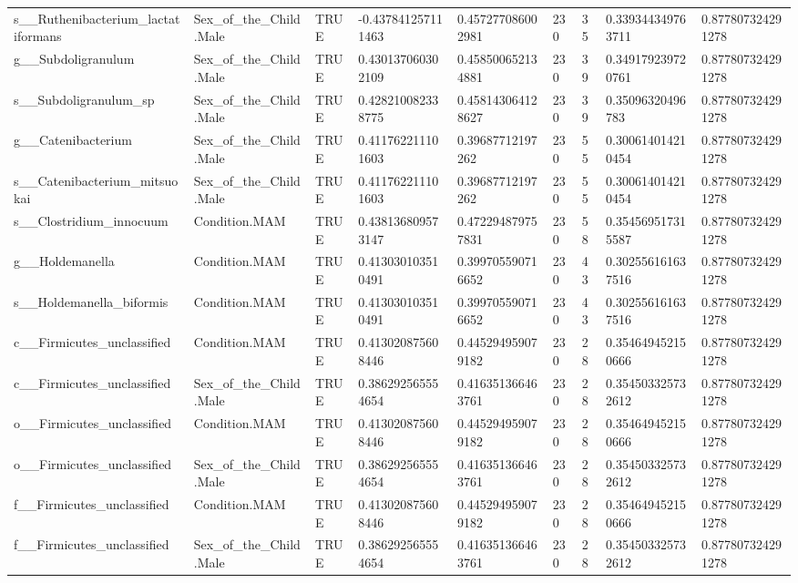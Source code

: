 \begin{longtable}{lllllllll}
s\_\_Ruthenibacterium\_lactatiformans & Sex\_of\_the\_Child.Male & TRUE & -0.437841257111463 & 0.457277086002981 & 230 & 35 & 0.339344349763711 & 0.877807324291278 \\
g\_\_Subdoligranulum & Sex\_of\_the\_Child.Male & TRUE & 0.430137060302109 & 0.458500652134881 & 230 & 39 & 0.349179239720761 & 0.877807324291278 \\
s\_\_Subdoligranulum\_sp & Sex\_of\_the\_Child.Male & TRUE & 0.428210082338775 & 0.458143064128627 & 230 & 39 & 0.35096320496783 & 0.877807324291278 \\
g\_\_Catenibacterium & Sex\_of\_the\_Child.Male & TRUE & 0.411762211101603 & 0.39687712197262 & 230 & 55 & 0.300614014210454 & 0.877807324291278 \\
s\_\_Catenibacterium\_mitsuokai & Sex\_of\_the\_Child.Male & TRUE & 0.411762211101603 & 0.39687712197262 & 230 & 55 & 0.300614014210454 & 0.877807324291278 \\
s\_\_Clostridium\_innocuum & Condition.MAM & TRUE & 0.438136809573147 & 0.472294879757831 & 230 & 58 & 0.354569517315587 & 0.877807324291278 \\
g\_\_Holdemanella & Condition.MAM & TRUE & 0.413030103510491 & 0.399705590716652 & 230 & 43 & 0.302556161637516 & 0.877807324291278 \\
s\_\_Holdemanella\_biformis & Condition.MAM & TRUE & 0.413030103510491 & 0.399705590716652 & 230 & 43 & 0.302556161637516 & 0.877807324291278 \\
c\_\_Firmicutes\_unclassified & Condition.MAM & TRUE & 0.413020875608446 & 0.445294959079182 & 230 & 28 & 0.354649452150666 & 0.877807324291278 \\
c\_\_Firmicutes\_unclassified & Sex\_of\_the\_Child.Male & TRUE & 0.386292565554654 & 0.416351366463761 & 230 & 28 & 0.354503325732612 & 0.877807324291278 \\
o\_\_Firmicutes\_unclassified & Condition.MAM & TRUE & 0.413020875608446 & 0.445294959079182 & 230 & 28 & 0.354649452150666 & 0.877807324291278 \\
o\_\_Firmicutes\_unclassified & Sex\_of\_the\_Child.Male & TRUE & 0.386292565554654 & 0.416351366463761 & 230 & 28 & 0.354503325732612 & 0.877807324291278 \\
f\_\_Firmicutes\_unclassified & Condition.MAM & TRUE & 0.413020875608446 & 0.445294959079182 & 230 & 28 & 0.354649452150666 & 0.877807324291278 \\
f\_\_Firmicutes\_unclassified & Sex\_of\_the\_Child.Male & TRUE & 0.386292565554654 & 0.416351366463761 & 230 & 28 & 0.354503325732612 & 0.877807324291278 \\

\end{longtable}

